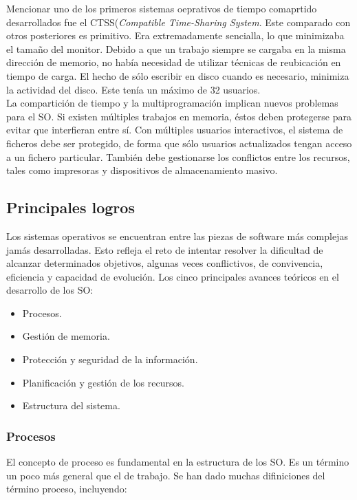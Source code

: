 \documentclass{article}
\begin{document}
				Mencionar uno de los primeros sistemas oeprativos de tiempo comaprtido desarrollados fue el CTSS(\textit{Compatible Time-Sharing System}. Este comparado con otros posteriores es primitivo. Era extremadamente sencialla, lo que minimizaba el tamaño del monitor. Debido a que un trabajo siempre se cargaba en la misma dirección de memorio, no había necesidad de utilizar técnicas de reubicación en tiempo de carga. El hecho de sólo escribir en disco cuando es necesario, minimiza la actividad del disco. Este tenía un máximo de 32 usuarios. \\
				
				La compartición de tiempo y la multiprogramación implican nuevos problemas para el SO. Si existen múltiples trabajos en memoria, éstos deben protegerse para evitar que interfieran entre sí. Con múltiples usuarios interactivos, el sistema de ficheros debe ser protegido, de forma que sólo usuarios actualizados tengan acceso a un fichero particular. También debe gestionarse los conflictos entre los recursos, tales como impresoras y dispositivos de almacenamiento masivo.
				
		\subsection{Principales logros}
			Los sistemas operativos se encuentran entre las piezas de software más complejas jamás desarrolladas. Esto refleja el reto de intentar resolver la dificultad de alcanzar determinados objetivos, algunas veces conflictivos, de convivencia, eficiencia y capacidad de evolución. Los cinco principales avances teóricos en el desarrollo de los SO:
			
			\begin{itemize}
			\item Procesos.
			\item Gestión de memoria.
			\item Protección y seguridad de la información.
			\item Planificación y gestión de los recursos.
			\item Estructura del sistema.
			\end{itemize}
			
			\subsubsection{Procesos}
				El concepto de proceso es fundamental en la estructura de los SO. Es un término un poco más general que el de trabajo. Se han dado muchas difiniciones del término proceso, incluyendo:
				
\end{document}
